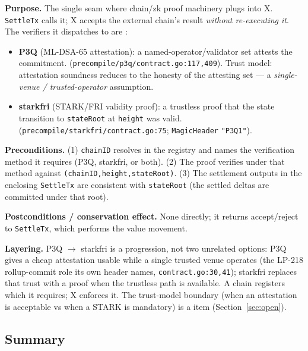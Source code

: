 \textbf{Purpose.} The single seam where chain/zk proof machinery plugs
into X. \texttt{SettleTx} calls it; X accepts the external chain's
result \emph{without re-executing it}. The verifiers it dispatches to
are \IMPL{}:

\begin{itemize}[leftmargin=2em,nosep]
\item \textbf{P3Q} (ML-DSA-65 attestation): a named-operator/validator
  set attests the commitment. \IMPL{}
  (\texttt{precompile/p3q/contract.go:117,409}). Trust model:
  attestation soundness reduces to the honesty of the attesting set ---
  a \emph{single-venue / trusted-operator} assumption.
\item \textbf{starkfri} (STARK/FRI validity proof): a trustless proof
  that the state transition to \texttt{stateRoot} at \texttt{height} was
  valid. \IMPL{}
  (\texttt{precompile/starkfri/contract.go:75}; \texttt{MagicHeader}
  \texttt{"P3Q1"}).
\end{itemize}

\textbf{Preconditions.} (1) \texttt{chainID} resolves in the registry
and names the verification method it requires (P3Q, starkfri, or both).
(2) The proof verifies under that method against
\texttt{(chainID,height,stateRoot)}. (3) The settlement outputs in the
enclosing \texttt{SettleTx} are consistent with \texttt{stateRoot}
(the settled deltas are committed under that root).

\textbf{Postconditions / conservation effect.} None directly; it returns
accept/reject to \texttt{SettleTx}, which performs the value movement.

\textbf{Layering.} P3Q $\to$ starkfri is a progression, not two
unrelated options: P3Q gives a cheap attestation usable while a single
trusted venue operates (the LP-218 rollup-commit role its own header
names, \texttt{contract.go:30,41}); starkfri replaces that trust with a
proof when the trustless path is available. A chain registers which it
requires; X enforces it. The trust-model boundary (when an attestation
is acceptable vs when a STARK is mandatory) is a
\CRYPTO{} item (Section~\ref{sec:open}).

\subsection{Summary}

